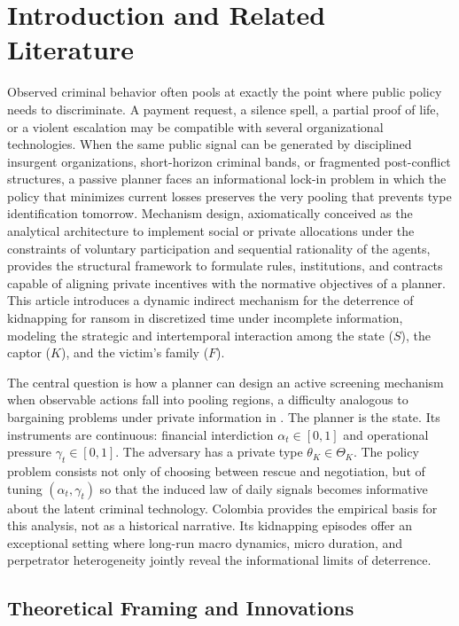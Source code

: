 \documentclass[review,authoryear,12pt]{elsarticle}
\theoremstyle{plain}
\theoremstyle{definition}
\newcommand{\ThetaK}{\Theta_K}
\newcommand{\1}{\mathbf{1}}
\begin{document}
\section{Introduction and Related Literature}\label{sec:intro}

Observed criminal behavior often pools at exactly the point where public policy needs to discriminate. A payment request, a silence spell, a partial proof of life, or a violent escalation may be compatible with several organizational technologies. When the same public signal can be generated by disciplined insurgent organizations, short-horizon criminal bands, or fragmented post-conflict structures, a passive planner faces an informational lock-in problem in which the policy that minimizes current losses preserves the very pooling that prevents type identification tomorrow. Mechanism design, axiomatically conceived as the analytical architecture to implement social or private allocations under the constraints of voluntary participation and sequential rationality of the agents, provides the structural framework to formulate rules, institutions, and contracts capable of aligning private incentives with the normative objectives of a planner. This article introduces a dynamic indirect mechanism for the deterrence of kidnapping for ransom in discretized time under incomplete information, modeling the strategic and intertemporal interaction among the state ($S$), the captor ($K$), and the victim's family ($F$).

The central question is how a planner can design an active screening mechanism when observable actions fall into pooling regions, a difficulty analogous to bargaining problems under private information in \citet{Fearon1995Rationalist}. The planner is the state. Its instruments are continuous: financial interdiction $\alpha_t\in[0,1]$ and operational pressure $\gamma_t\in[0,1]$. The adversary has a private type $\theta_K\in\ThetaK$. The policy problem consists not only of choosing between rescue and negotiation, but of tuning $(\alpha_t,\gamma_t)$ so that the induced law of daily signals becomes informative about the latent criminal technology. Colombia provides the empirical basis for this analysis, not as a historical narrative. Its kidnapping episodes offer an exceptional setting where long-run macro dynamics, micro duration, and perpetrator heterogeneity jointly reveal the informational limits of deterrence.

\subsection{Theoretical Framing and Innovations}\label{subsec:framing}
\end{document}
